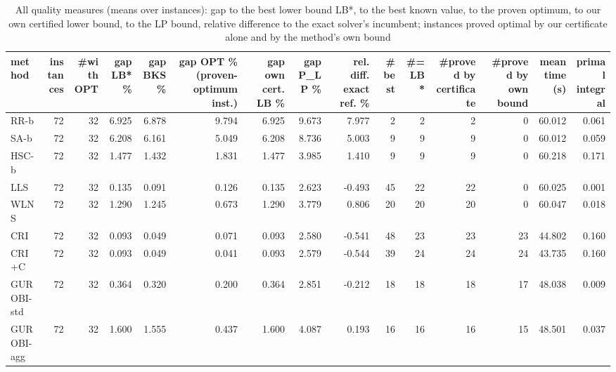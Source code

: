 \begin{table}[htbp]
\centering
\small
\caption{All quality measures (means over instances): gap to the best lower bound LB*, to the best known value, to the proven optimum, to our own certified lower bound, to the LP bound, relative difference to the exact solver's incumbent; instances proved optimal by our certificate alone and by the method's own bound}
\label{tab:E4b_equal_budgets_60s_b60_all_metrics}
\begin{tabular}{lrrrrrrrrrrrrrr}
\toprule
method & instances & \#with OPT & gap LB* \% & gap BKS \% & gap OPT \% (proven-optimum inst.) & gap own cert. LB \% & gap P\_LP \% & rel. diff. exact ref. \% & \#best & \#= LB* & \#proved by certificate & \#proved by own bound & mean time (s) & primal integral \\
\midrule
RR-b & 72 & 32 & 6.925 & 6.878 & 9.794 & 6.925 & 9.673 & 7.977 & 2 & 2 & 2 & 0 & 60.012 & 0.061 \\
SA-b & 72 & 32 & 6.208 & 6.161 & 5.049 & 6.208 & 8.736 & 5.003 & 9 & 9 & 9 & 0 & 60.012 & 0.059 \\
HSC-b & 72 & 32 & 1.477 & 1.432 & 1.831 & 1.477 & 3.985 & 1.410 & 9 & 9 & 9 & 0 & 60.218 & 0.171 \\
LLS & 72 & 32 & 0.135 & 0.091 & 0.126 & 0.135 & 2.623 & -0.493 & 45 & 22 & 22 & 0 & 60.025 & 0.001 \\
WLNS & 72 & 32 & 1.290 & 1.245 & 0.673 & 1.290 & 3.779 & 0.806 & 20 & 20 & 20 & 0 & 60.047 & 0.018 \\
CRI & 72 & 32 & 0.093 & 0.049 & 0.071 & 0.093 & 2.580 & -0.541 & 48 & 23 & 23 & 23 & 44.802 & 0.160 \\
CRI+C & 72 & 32 & 0.093 & 0.049 & 0.041 & 0.093 & 2.579 & -0.544 & 39 & 24 & 24 & 24 & 43.735 & 0.160 \\
GUROBI-std & 72 & 32 & 0.364 & 0.320 & 0.200 & 0.364 & 2.851 & -0.212 & 18 & 18 & 18 & 17 & 48.038 & 0.009 \\
GUROBI-agg & 72 & 32 & 1.600 & 1.555 & 0.437 & 1.600 & 4.087 & 0.193 & 16 & 16 & 16 & 15 & 48.501 & 0.037 \\
\bottomrule
\end{tabular}
\end{table}
